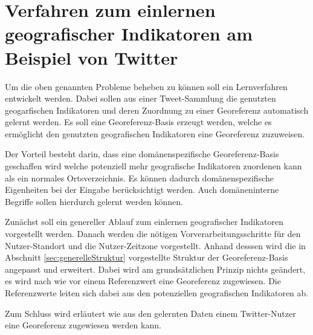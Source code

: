 	\section{Verfahren zum einlernen geografischer Indikatoren am Beispiel von Twitter} 

		Um die oben genannten Probleme beheben zu können soll ein Lernverfahren entwickelt werden.
		Dabei sollen aus einer Tweet-Sammlung die genutzten geogarfischen Indikatoren und deren Zuordnung zu einer Georeferenz automatisch gelernt werden.
		Es soll eine Georeferenz-Basis erzeugt werden, welche es ermöglicht den genutzten geografischen Indikatoren eine Georeferenz zuzuweisen. 

		Der Vorteil besteht darin, dass eine domänenspezifische Georeferenz-Basis geschaffen wird welche potenziell mehr geografische Indikatoren zuordenen kann als ein normales Ortsverzeichnis.
		Es können dadurch domänenspezifische Eigenheiten bei der Eingabe berücksichtigt werden. 
		Auch domäneninterne Begriffe sollen hierdurch gelernt werden können. 

		Zunächst soll ein genereller Ablauf zum einlernen geografischer Indikatoren vorgestellt werden.
		Danach werden die nötigen Vorverarbeitungsschritte für den Nutzer-Standort und die Nutzer-Zeitzone vorgestellt.
		Anhand desssen wird die in Abschnitt \ref{sec:generelleStruktur} vorgestellte Struktur der Georeferenz-Basis angepasst und erweitert.
		Dabei wird am grundsätzlichen Prinzip nichts geändert, es wird nach wie vor einem Referenzwert eine Georeferenz zugewiesen.
		Die Referenzwerte leiten sich dabei aus den potenziellen geografischen Indikatoren ab.

		Zum Schluss wird erläutert wie aus den gelernten Daten einem Twitter-Nutzer eine Georeferenz zugewiesen werden kann.  


